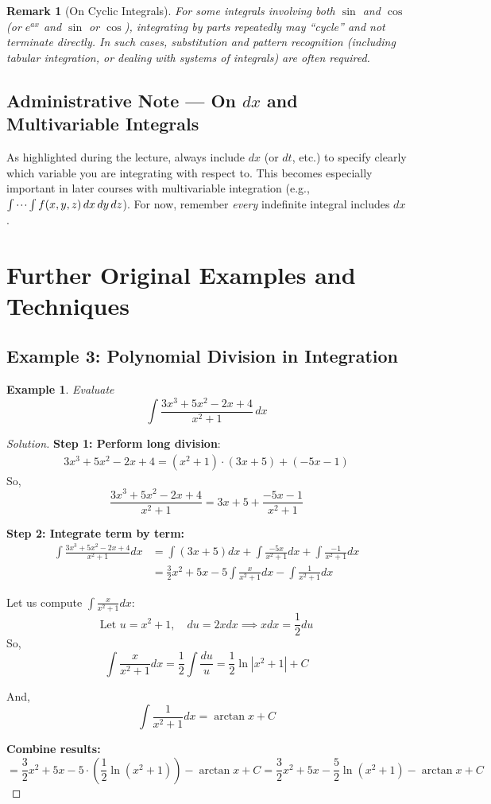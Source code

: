 \documentclass[11pt]{article}
\newtheorem{example}[definition]{Example}
\newtheorem{remark}[definition]{Remark}
\theoremstyle{definition}
\begin{document}
\begin{remark}[On Cyclic Integrals]
For some integrals involving both $\sin$ and $\cos$ (or $e^{ax}$ and $\sin$ or $\cos$), integrating by parts repeatedly may “cycle” and not terminate directly. In such cases, substitution and pattern recognition (including tabular integration, or dealing with systems of integrals) are often required.
\end{remark}

\subsection{Administrative Note — On $dx$ and Multivariable Integrals}
As highlighted during the lecture, always include $dx$ (or $dt$, etc.) to specify clearly which variable you are integrating with respect to. This becomes especially important in later courses with multivariable integration (e.g., $\idotsint f(x, y, z)\, dx\, dy\, dz$). For now, remember \emph{every} indefinite integral includes $dx$.

\section{Further Original Examples and Techniques}

\subsection*{Example 3: Polynomial Division in Integration}

\begin{example}\label{ex:polydivision}
Evaluate
\[
\int \frac{3x^3 + 5x^2 - 2x + 4}{x^2 + 1}\, dx
\]
\end{example}

\begin{proof}[Solution]
\textbf{Step 1: Perform long division}:
\begin{align*}
3x^3 + 5x^2 - 2x + 4 = (x^2 + 1)\cdot(3x + 5) + (-5x - 1)
\end{align*}
So,
\[
\frac{3x^3 + 5x^2 - 2x + 4}{x^2 + 1} = 3x + 5 + \frac{-5x - 1}{x^2 + 1}
\]

\textbf{Step 2: Integrate term by term:}
\begin{align*}
\int \frac{3x^3 + 5x^2 - 2x + 4}{x^2 + 1} dx 
    &= \int (3x + 5) dx + \int \frac{-5x}{x^2 + 1} dx + \int \frac{-1}{x^2 + 1} dx \\
    &= \frac{3}{2} x^2 + 5x - 5 \int \frac{x}{x^2 + 1} dx - \int \frac{1}{x^2 + 1} dx
\end{align*}

Let us compute $\int \frac{x}{x^2+1} dx$:
\[
\text{Let } u = x^2 + 1, \quad du = 2x dx \implies x dx = \frac{1}{2} du
\]
So,
\[
\int \frac{x}{x^2 + 1} dx = \frac{1}{2} \int \frac{du}{u} = \frac{1}{2} \ln|x^2 + 1| + C
\]

And,
\[
\int \frac{1}{x^2+1} dx = \arctan x + C
\]

\textbf{Combine results:}
\[
= \frac{3}{2} x^2 + 5x - 5 \cdot \left( \frac{1}{2} \ln(x^2 + 1) \right ) - \arctan x + C
= \frac{3}{2} x^2 + 5x - \frac{5}{2} \ln(x^2 + 1) - \arctan x + C
\]
\end{proof}
\end{document}

